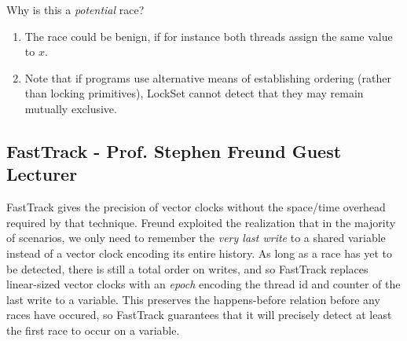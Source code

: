 \documentclass[twoside]{article}
\begin{document}
Why is this a \emph{potential} race?
\begin{enumerate}
    \item The race could be benign, if for instance both threads assign the same
        value to $x$.
    \item Note that if programs use alternative means of establishing ordering
        (rather than locking primitives), LockSet cannot detect that they may
        remain mutually exclusive.
\end{enumerate}


\subsection{FastTrack - Prof. Stephen Freund Guest Lecturer}
FastTrack gives the precision of vector clocks without the space/time overhead
required by that technique. Freund exploited the realization that in the
majority of scenarios, we only need to remember the \emph{very last write} to a
shared variable instead of a vector clock encoding its entire history. As long
as a race has yet to be detected, there is still a total order on writes, and so
FastTrack replaces linear-sized vector clocks with an \emph{epoch} encoding the
thread id and counter of the last write to a variable. This preserves the
happens-before relation before any races have occured, so FastTrack guarantees
that it will precisely detect at least the first race to occur on a variable.
\end{document}
